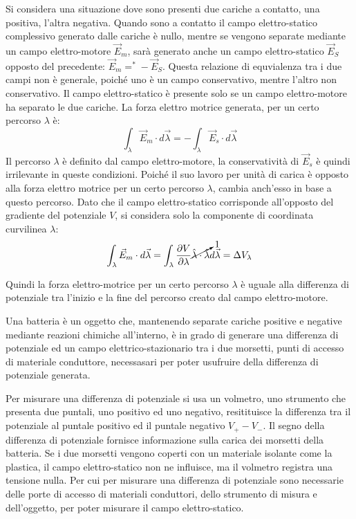 \documentclass{article}
\numberwithin{equation}{subsection}
\begin{document}
Si considera una situazione dove sono presenti due cariche a contatto, una positiva, l'altra negativa. Quando sono a contatto il campo elettro-statico complessivo generato 
dalle cariche è nullo, mentre se vengono separate mediante un campo elettro-motore $\vec{E}_m$, sarà generato anche un campo elettro-statico $\vec{E}_S$ opposto del precedente: 
$\vec{E}_m=^*-\vec{E}_S$. Questa relazione di equvialenza tra i due campi non è generale, poiché uno è un campo conservativo, mentre l'altro non conservativo. Il campo 
elettro-statico è presente solo se un campo elettro-motore ha separato le due cariche. 
La forza elettro motrice generata, per un certo percorso $\lambda$ è:
\begin{equation*}
    \displaystyle\int_{\lambda}\vec{E}_m\cdot d\vec{\lambda}=-\int_{\lambda}\vec{E}_s\cdot d\vec{\lambda}
\end{equation*}
Il percorso $\lambda$ è definito dal campo elettro-motore, la conservatività di $\vec{E}_s$ è quindi irrilevante in queste condizioni. Poiché il suo lavoro per unità di carica 
è opposto alla forza elettro motrice per un certo percorso $\lambda$, cambia anch'esso in base a questo percorso. Dato che il campo elettro-statico corrisponde all'opposto del 
gradiente del potenziale $V$, si considera solo la componente di coordinata curvilinea $\lambda$: 
\begin{equation*}
    \displaystyle\int_{\lambda}\vec{E}_m\cdot d\vec{\lambda}=\int_{\lambda}\frac{\partial V}{\partial\lambda}\cancelto{1}{\hat{\lambda}\cdot\hat{\lambda}}d\vec{\lambda}=\Delta V_{\lambda}
\end{equation*}

Quindi la forza elettro-motrice per un certo percorso $\lambda$ è uguale alla differenza di potenziale tra l'inizio e la fine del percorso creato dal campo elettro-motore. 
 


Una batteria è un oggetto che, mantenendo separate cariche positive e negative mediante reazioni chimiche all'interno, è in grado di generare una differenza di potenziale 
ed un campo elettrico-stazionario tra i due morsetti, punti di accesso di materiale conduttore, necessasari per poter usufruire della differenza di potenziale generata. 

Per misurare una differenza di potenziale si usa un volmetro, uno strumento che presenta due puntali, uno positivo ed uno negativo, resitituisce la differenza tra il potenziale 
al puntale positivo ed il puntale negativo $V_+-V_-$. Il segno della differenza di potenziale fornisce informazione sulla carica dei morsetti della batteria. Se i due morsetti 
vengono coperti con un materiale isolante come la plastica, il campo elettro-statico non ne influisce, ma il volmetro registra una tensione nulla. Per cui per misurare una 
differenza di potenziale sono necessarie delle porte di accesso di materiali conduttori, dello strumento di misura e dell'oggetto, per poter misurare il campo elettro-statico. 
\end{document}
